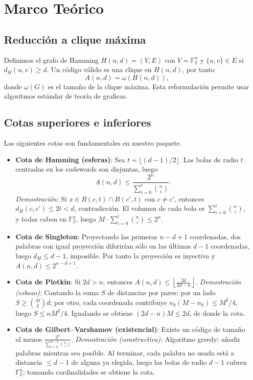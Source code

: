 \documentclass[12pt, spanish]{article}
\begin{document}
\section{Marco Teórico}
\subsection{Reducción a clique máxima}
Definimos el grafo de Hamming $H(n,d)=(V,E)$ con $V=\mathbb{F}_2^n$ y $\{u,v\}\in E$ si $d_H(u,v)\ge d$. Un código válido es una clique en $H(n,d)$, por tanto
\[
A(n,d)=\omega(H(n,d)),
\]
donde $\omega(G)$ es el tamaño de la clique máxima. Esta reformulación permite usar algoritmos estándar de teoría de graficas.

\subsection{Cotas superiores e inferiores}
Las siguientes cotas son fundamentales en nuestro paquete.

\begin{itemize}
\item \textbf{Cota de Hamming (esferas)}:  
  Sea $t=\lfloor (d-1)/2\rfloor$. Las bolas de radio $t$ centradas en los codewords son disjuntas, luego
  \[
  A(n,d)\le \frac{2^n}{\sum_{i=0}^{t}\binom{n}{i}}.
  \]
  \textit{Demostración:} Si $x\in B(c,t)\cap B(c',t)$ con $c\neq c'$, entonces $d_H(c,c')\le 2t<d$, contradicción. El volumen de cada bola es $\sum_{i=0}^t\binom{n}{i}$, y todas caben en $\mathbb{F}_2^n$, luego $M\cdot\sum_{i=0}^t\binom{n}{i}\le 2^n$.

\item \textbf{Cota de Singleton}:  
  Proyectando las primeras $n-d+1$ coordenadas, dos palabras con igual proyección diferirían sólo en las últimas $d-1$ coordenadas, luego $d_H\le d-1$, imposible. Por tanto la proyección es inyectiva y $A(n,d)\le 2^{n-d+1}$.

\item \textbf{Cota de Plotkin}:  
  Si $2d>n$, entonces $A(n,d)\le \left\lfloor\frac{2d}{2d-n}\right\rfloor$.  
  \textit{Demostración (esbozo):} Contando la suma $S$ de distancias por pares: por un lado $S\ge \binom{M}{2}d$; por otro, cada coordenada contribuye $n_k(M-n_k)\le M^2/4$, luego $S\le nM^2/4$. Igualando se obtiene $(2d-n)M\le 2d$, de donde la cota.

\item \textbf{Cota de Gilbert–Varshamov (existencial)}:  
  Existe un código de tamaño al menos $\frac{2^n}{\sum_{i=0}^{d-1}\binom{n}{i}}$.  
  \textit{Demostración (constructiva):} Algoritmo greedy: añadir palabras mientras sea posible. Al terminar, cada palabra no usada está a distancia $\le d-1$ de alguna ya elegida, luego las bolas de radio $d-1$ cubren $\mathbb{F}_2^n$; tomando cardinalidades se obtiene la cota.
\end{itemize}
\end{document}
